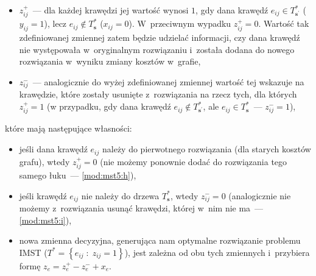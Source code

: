 \begin{itemize}
	\item $z_{ij}^{+}$~--- dla każdej krawędzi jej wartość wynosi $1$, gdy dana krawędź $e_{ij} \in T^{\ast}_{\textbf{s}^{\prime}}$ ($y_{ij} = 1$), lecz $e_{ij} \notin T^{\ast}_{\textbf{s}}$ ($x_{ij} = 0$).
	W~przeciwnym wypadku $z_{ij}^{+} = 0$.
	Wartość tak zdefiniowanej zmiennej zatem będzie udzielać informacji, czy dana krawędź nie występowała w~oryginalnym rozwiązaniu i~została dodana do nowego rozwiązania w~wyniku zmiany kosztów w~grafie,
	\item $z_{ij}^{-}$~--- analogicznie do wyżej zdefiniowanej zmiennej wartość tej wskazuje na krawędzie, które zostały usunięte z~rozwiązania na rzecz tych, dla których $z_{ij}^{+} = 1$ (w przypadku, gdy dana krawędź $e_{ij} \notin T^{\ast}_{\textbf{s}^{\prime}}$, ale $e_{ij} \in T^{\ast}_{\textbf{s}}$~--- $z_{ij}^{-} = 1$),
\end{itemize}
które mają następujące własności:
\begin{itemize}
	\item jeśli dana krawędź $e_{ij}$ należy do pierwotnego rozwiązania (dla starych kosztów grafu), wtedy $z_{ij}^{+} = 0$ (nie możemy ponownie dodać do rozwiązania tego samego łuku~--- \ref{mod:mst5:h}),
	\item jeśli krawędź $e_{ij}$ nie należy do drzewa $T^{\ast}_{\textbf{s}}$, wtedy $z_{ij}^{-} = 0$ (analogicznie nie możemy z~rozwiązania usunąć krawędzi, której w~nim nie ma~--- \ref{mod:mst5:i}),
	\item nowa zmienna decyzyjna, generująca nam optymalne rozwiązanie problemu \textsc{IMST} ($T^{\ast} = \left\{ e_{ij} \; : \; z_{ij} = 1 \right\}$), jest zależna od obu tych zmiennych i~przybiera formę $z_{e} = z^{+}_{e} - z^{-}_{e} + x_{e}$.
\end{itemize}

